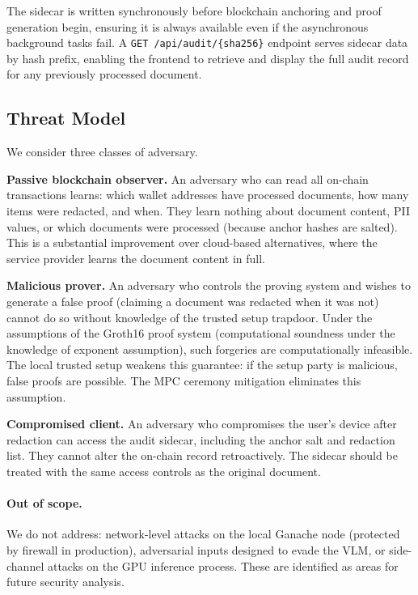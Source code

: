 The sidecar is written synchronously before
blockchain anchoring and proof generation begin,
ensuring it is always available even if the
asynchronous background tasks fail.
A \texttt{GET /api/audit/\{sha256\}} endpoint serves
sidecar data by hash prefix, enabling the frontend
to retrieve and display the full audit record
for any previously processed document.

\subsection{Threat Model}

We consider three classes of adversary.

\textbf{Passive blockchain observer.}
An adversary who can read all on-chain transactions
learns: which wallet addresses have processed
documents, how many items were redacted, and when.
They learn nothing about document content, PII
values, or which documents were processed (because
anchor hashes are salted).
This is a substantial improvement over cloud-based
alternatives, where the service provider learns
the document content in full.

\textbf{Malicious prover.}
An adversary who controls the proving system
and wishes to generate a false proof (claiming a
document was redacted when it was not) cannot do
so without knowledge of the trusted setup trapdoor.
Under the assumptions of the Groth16 proof system
(computational soundness under the knowledge
of exponent assumption), such forgeries are
computationally infeasible.
The local trusted setup weakens this guarantee:
if the setup party is malicious, false proofs
are possible.
The MPC ceremony mitigation eliminates this
assumption.

\textbf{Compromised client.}
An adversary who compromises the user's device
after redaction can access the audit sidecar,
including the anchor salt and redaction list.
They cannot alter the on-chain record retroactively.
The sidecar should be treated with the same access
controls as the original document.

\paragraph{Out of scope.}
We do not address: network-level attacks on the
local Ganache node (protected by firewall in
production), adversarial inputs designed to evade
the VLM, or side-channel attacks on the GPU
inference process.
These are identified as areas for future security
analysis.

